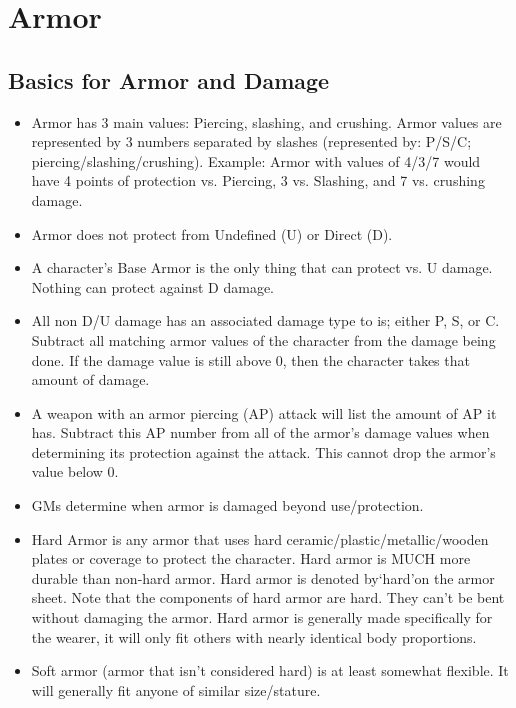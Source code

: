 \documentclass[twoside]{book}
\begin{document}
    

\section{Armor}
    
    

\subsection{Basics for Armor and Damage}
    
\begin{itemize}
      
  \item Armor has 3 main values: Piercing, slashing, and crushing. Armor values are represented by 3 numbers separated by slashes (represented by: P/S/C; piercing/slashing/crushing). Example: Armor with values of 4/3/7 would have 4 points of protection vs. Piercing, 3 vs. Slashing, and 7 vs. crushing damage.
  \item Armor does not protect from Undefined (U) or Direct (D).
  \item A character's Base Armor is the only thing that can protect vs. U damage. Nothing can protect against D damage.
  \item All non D/U damage has an associated damage type to is; either P, S, or C. Subtract all matching armor values of the character from the damage being done. If the damage value is still above 0, then the character takes that amount of damage.
  \item A weapon with an armor piercing (AP) attack will list the amount of AP it has. Subtract this AP number from all of the armor's damage values when determining its protection against the attack. This cannot drop the armor's value below 0.
  \item GMs determine when armor is damaged beyond use/protection.
  \item Hard Armor is any armor that uses hard ceramic/plastic/metallic/wooden plates or coverage to protect the character. Hard armor is MUCH more durable than non-hard armor. Hard armor is denoted by`hard'on the armor sheet. Note that the components of hard armor are hard. They can't be bent without damaging the armor. Hard armor is generally made specifically for the wearer, it will only fit others with nearly identical body proportions.
  \item Soft armor (armor that isn't considered hard) is at least somewhat flexible. It will generally fit anyone of similar size/stature.

\end{itemize}
\end{document}
